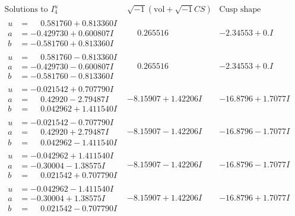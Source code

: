 \documentclass[1p]{elsarticle_modified}
\theoremstyle{definition}
\newcommand{\I}{\sqrt{-1}}
\begin{document}
$$\begin{array}{c|c|c}  
\text{Solutions to }I^u_{4}& \I (\text{vol} + \sqrt{-1}CS) & \text{Cusp shape}\\
 \hline 
\begin{aligned}
u &= \phantom{-}0.581760 + 0.813360 I \\
a &= -0.429730 + 0.600807 I \\
b &= -0.581760 + 0.813360 I\end{aligned}
 & \phantom{-}0.265516\phantom{ +0.000000I} & -2.34553 + 0. I\phantom{ +0.000000I} \\ \hline\begin{aligned}
u &= \phantom{-}0.581760 - 0.813360 I \\
a &= -0.429730 - 0.600807 I \\
b &= -0.581760 - 0.813360 I\end{aligned}
 & \phantom{-}0.265516\phantom{ +0.000000I} & -2.34553 + 0. I\phantom{ +0.000000I} \\ \hline\begin{aligned}
u &= -0.021542 + 0.707790 I \\
a &= \phantom{-}0.42920 - 2.79487 I \\
b &= \phantom{-}0.042962 + 1.411540 I\end{aligned}
 & -8.15907 + 1.42206 I & -16.8796 + 1.7077 I \\ \hline\begin{aligned}
u &= -0.021542 - 0.707790 I \\
a &= \phantom{-}0.42920 + 2.79487 I \\
b &= \phantom{-}0.042962 - 1.411540 I\end{aligned}
 & -8.15907 - 1.42206 I & -16.8796 - 1.7077 I \\ \hline\begin{aligned}
u &= -0.042962 + 1.411540 I \\
a &= -0.30004 - 1.38575 I \\
b &= \phantom{-}0.021542 + 0.707790 I\end{aligned}
 & -8.15907 - 1.42206 I & -16.8796 - 1.7077 I \\ \hline\begin{aligned}
u &= -0.042962 - 1.411540 I \\
a &= -0.30004 + 1.38575 I \\
b &= \phantom{-}0.021542 - 0.707790 I\end{aligned}
 & -8.15907 + 1.42206 I & -16.8796 + 1.7077 I \\ \hline\begin{aligned}

\end{aligned}
\end{array}$$
\end{document}
